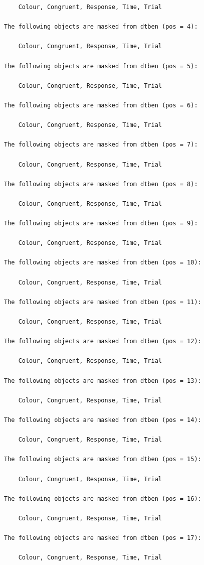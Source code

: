 \documentclass{article}
\begin{document}
\begin{verbatim}
    Colour, Congruent, Response, Time, Trial

The following objects are masked from dtben (pos = 4):

    Colour, Congruent, Response, Time, Trial

The following objects are masked from dtben (pos = 5):

    Colour, Congruent, Response, Time, Trial

The following objects are masked from dtben (pos = 6):

    Colour, Congruent, Response, Time, Trial

The following objects are masked from dtben (pos = 7):

    Colour, Congruent, Response, Time, Trial

The following objects are masked from dtben (pos = 8):

    Colour, Congruent, Response, Time, Trial

The following objects are masked from dtben (pos = 9):

    Colour, Congruent, Response, Time, Trial

The following objects are masked from dtben (pos = 10):

    Colour, Congruent, Response, Time, Trial

The following objects are masked from dtben (pos = 11):

    Colour, Congruent, Response, Time, Trial

The following objects are masked from dtben (pos = 12):

    Colour, Congruent, Response, Time, Trial

The following objects are masked from dtben (pos = 13):

    Colour, Congruent, Response, Time, Trial

The following objects are masked from dtben (pos = 14):

    Colour, Congruent, Response, Time, Trial

The following objects are masked from dtben (pos = 15):

    Colour, Congruent, Response, Time, Trial

The following objects are masked from dtben (pos = 16):

    Colour, Congruent, Response, Time, Trial

The following objects are masked from dtben (pos = 17):

    Colour, Congruent, Response, Time, Trial


\end{verbatim}
\end{document}
